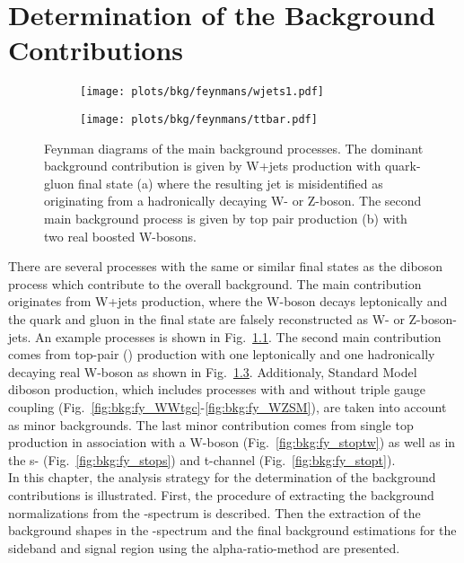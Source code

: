 \chapter{Determination of the Background Contributions}
\label{chap:DeterminationoftheBackgroundContributions}
\begin{figure}[H!b]
	\centering
	\begin{subfigure}{0.4\textwidth}
		\texttt{[image: plots/bkg/feynmans/wjets1.pdf]}
		\caption{}
		\label{fig:bkg:fy_wjets1}
	\end{subfigure}
	\begin{subfigure}{0.4\textwidth}
		\texttt{[image: plots/bkg/feynmans/ttbar.pdf]}
		\caption{}
		\label{fig:bkg:fy_ttbar}
	\end{subfigure}
	\caption[Feynman diagrams of the main background processes.]{Feynman diagrams of the main background processes. The dominant background contribution is given by W+jets production with quark-gluon final state (a) where the resulting jet is misidentified as originating from a hadronically decaying W- or Z-boson. The second main background process is given by top pair production (b) with two real boosted W-bosons.}
\end{figure}
There are several processes with the same or similar final states as the diboson process which contribute to the overall background. The main contribution originates from W+jets production, where the W-boson decays leptonically and the quark and gluon in the final state are falsely reconstructed as W- or Z-boson-jets. An example processes is shown in Fig.~\ref{fig:bkg:fy_wjets1}. The second main contribution comes from top-pair (\ttbar) production with one leptonically and one hadronically decaying real W-boson as shown in Fig.~\ref{fig:bkg:fy_ttbar}. Additionaly, Standard Model diboson production, which includes processes with and without triple gauge coupling (Fig.~\ref{fig:bkg:fy_WWtgc}-\ref{fig:bkg:fy_WZSM}), are taken into account as minor backgrounds. The last minor contribution comes from single top production in association with a W-boson (Fig.~\ref{fig:bkg:fy_stoptw}) as well as in the s- (Fig.~\ref{fig:bkg:fy_stops}) and t-channel (Fig.~\ref{fig:bkg:fy_stopt}).\\
In this chapter, the analysis strategy for the determination of the background contributions is illustrated.  First, the procedure of extracting the background normalizations from the \Mpr -spectrum is described. Then the extraction of the background shapes in the \MWV -spectrum and the final background estimations for the sideband and signal region using the alpha-ratio-method are presented.


